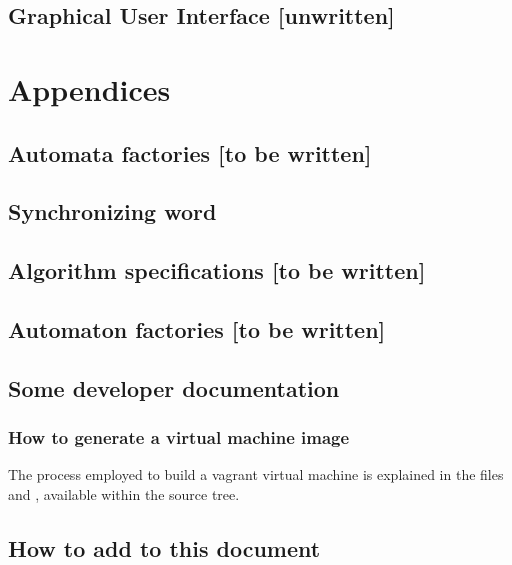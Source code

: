 \chapter{Graphical User Interface [unwritten]}

\part{Appendices}
\begin{appendices}
\chapter{Automata factories [to be written]}

\chapter{Synchronizing word}


\chapter{Algorithm specifications [to be written]}

\chapter{Automaton factories [to be written]}

\chapter{Some developer documentation}


\section{How to generate a virtual machine image}
The process employed to build a vagrant virtual machine
is explained in the files
and
, available within the source tree.


\chapter{How to add to this document}


\end{appendices}


\backmatter

\cleardoublepage

%

\cleardoublepage
\printindex


